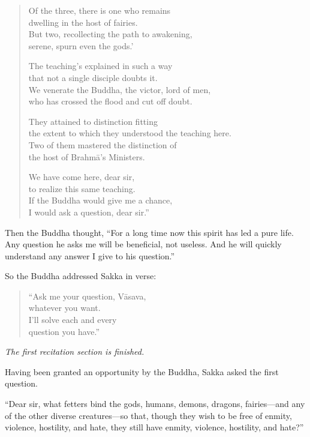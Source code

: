 \documentclass[12pt,openany]{book}%
\newcommand*{\scendsection}[1]{\begin{center}\textit{#1}\end{center}}
\begin{document}
\begin{verse}
Of the three, there is one who remains \\
dwelling in the host of fairies. \\
But two, recollecting the path to awakening, \\
serene, spurn even the gods.’ 

The teaching’s explained in such a way \\
that not a single disciple doubts it. \\
We venerate the Buddha, the victor, lord of men, \\
who has crossed the flood and cut off doubt. 

They attained to distinction fitting \\
the extent to which they understood the teaching here. \\
Two of them mastered the distinction of \\
the host of \textsanskrit{Brahmā}’s Ministers. 

We have come here, dear sir, \\
to realize this same teaching. \\
If the Buddha would give me a chance, \\
I would ask a question, dear sir.” 

%
\end{verse}

Then the Buddha thought, “For a long time now this spirit has led a pure life. Any question he asks me will be beneficial, not useless. And he will quickly understand any answer I give to his question.” 

So the Buddha addressed Sakka in verse: 

\begin{verse}%
“Ask me your question, \textsanskrit{Vāsava}, \\
whatever you want. \\
I’ll solve each and every \\
question you have.” 

%
\end{verse}

\scendsection{The first recitation section is finished. }

Having been granted an opportunity by the Buddha, Sakka asked the first question. 

“Dear sir, what fetters bind the gods, humans, demons, dragons, fairies—and any of the other diverse creatures—so that, though they wish to be free of enmity, violence, hostility, and hate, they still have enmity, violence, hostility, and hate?” 
\end{document}
